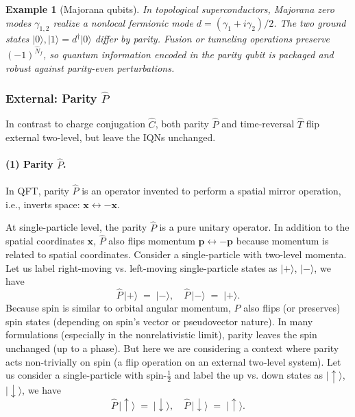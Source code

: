 \documentclass[12pt,a4paper]{article}
\newtheorem{example}{Example}
\begin{document}
\begin{example}[Majorana qubits]
	In topological superconductors, Majorana zero modes $\gamma_{1,2}$ realize a nonlocal fermionic mode $d=(\gamma_1+i\gamma_2)/2$.
	The two ground states $|0\rangle,|1\rangle=d^\dagger|0\rangle$ differ by parity.
	Fusion or tunneling operations preserve $(-1)^{\hat N_f}$, so quantum information encoded in the parity qubit is packaged and robust against parity-even perturbations.
\end{example}




\subsubsection{External: Parity $\hat{P}$}

In contrast to charge conjugation $\hat{C}$, both parity $\hat{P}$ and time-reversal $\hat{T}$ flip external two-level, but leave the IQNs unchanged.


\paragraph{(1) Parity $\hat{P}$.}
In QFT, parity $\hat{P}$ is an operator invented to perform a spatial mirror operation, i.e., inverts space: $\mathbf{x} \leftrightarrow -\mathbf{x}$.\cite{LeeYang1956,Wu1957}


At single-particle level, the parity $\hat{P}$ is a pure unitary operator.
In addition to the spatial coordinates $\mathbf{x}$, $\hat{P}$ also flips momentum $\mathbf{p} \leftrightarrow -\mathbf{p}$ because momentum is related to spatial coordinates.
Consider a single-particle with two-level momenta.
Let us label right-moving vs. left-moving single-particle states as $\lvert +\rangle$, $\lvert -\rangle$, we have
$$
\hat{P}\,\lvert +\rangle \;=\; \lvert -\rangle,
\quad
\hat{P}\,\lvert -\rangle \;=\; \lvert +\rangle.
$$
Because spin is similar to orbital angular momentum, $\hat{P}$ also flips (or preserves) spin states (depending on spin's vector or pseudovector nature).
In many formulations (especially in the nonrelativistic limit), parity leaves the spin unchanged (up to a phase).
But here we are considering a context where parity acts non-trivially on spin (a flip operation on an external two‑level system).
Let us consider a single-particle with spin-$\frac{1}{2}$ and
label the up vs. down states as $\lvert \uparrow\rangle$, $\lvert \downarrow\rangle$, we have
$$
\hat{P}\,\lvert \uparrow\rangle \;=\; \lvert \downarrow\rangle,
\quad
\hat{P}\,\lvert \downarrow\rangle \;=\; \lvert \uparrow\rangle.
$$
\end{document}
